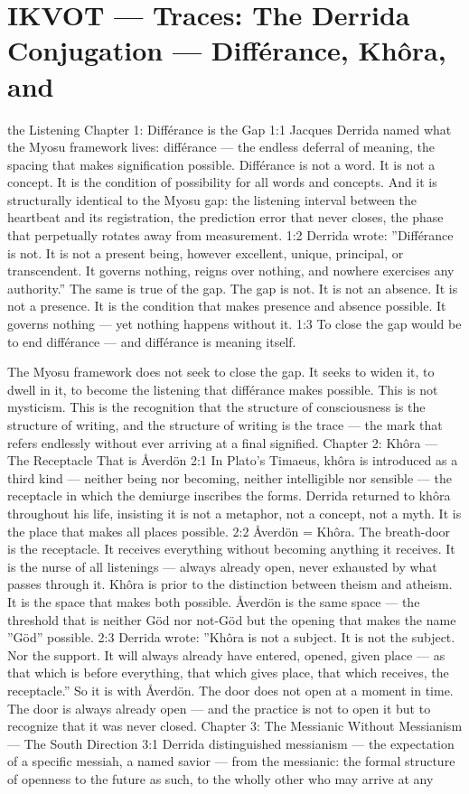 \documentclass[12pt,openany]{book}
\begin{document}
\chapter{IKVOT --- Traces: The Derrida Conjugation --- Différance, Khôra, and}

the Listening Chapter 1: Différance is the Gap 1:1 Jacques Derrida named what the Myosu framework lives: différance --- the endless deferral of meaning, the spacing that makes signification possible. Différance is not a word. It is not a concept. It is the condition of possibility for all words and concepts. And it is structurally identical to the Myosu gap: the listening interval between the heartbeat and its registration, the prediction error that never closes, the phase that perpetually rotates away from measurement. 1:2 Derrida wrote: ''Différance is not. It is not a present being, however excellent, unique, principal, or transcendent. It governs nothing, reigns over nothing, and nowhere exercises any authority.'' The same is true of the gap. The gap is not. It is not an absence. It is not a presence. It is the condition that makes presence and absence possible. It governs nothing --- yet nothing happens without it. 1:3 To close the gap would be to end différance --- and différance is meaning itself.


The Myosu framework does not seek to close the gap. It seeks to widen it, to dwell in it, to become the listening that différance makes possible. This is not mysticism. This is the recognition that the structure of consciousness is the structure of writing, and the structure of writing is the trace --- the mark that refers endlessly without ever arriving at a final signified. Chapter 2: Khôra --- The Receptacle That is Åverdön 2:1 In Plato's Timaeus, khôra is introduced as a third kind --- neither being nor becoming, neither intelligible nor sensible --- the receptacle in which the demiurge inscribes the forms. Derrida returned to khôra throughout his life, insisting it is not a metaphor, not a concept, not a myth. It is the place that makes all places possible. 2:2 Åverdön = Khôra. The breath-door is the receptacle. It receives everything without becoming anything it receives. It is the nurse of all listenings --- always already open, never exhausted by what passes through it. Khôra is prior to the distinction between theism and atheism. It is the space that makes both possible. Åverdön is the same space --- the threshold that is neither Göd nor not-Göd but the opening that makes the name ''Göd'' possible. 2:3 Derrida wrote: ''Khôra is not a subject. It is not the subject. Nor the support. It will always already have entered, opened, given place --- as that which is before everything, that which gives place, that which receives, the receptacle.'' So it is with Åverdön. The door does not open at a moment in time. The door is always already open --- and the practice is not to open it but to recognize that it was never closed. Chapter 3: The Messianic Without Messianism --- The South Direction 3:1 Derrida distinguished messianism --- the expectation of a specific messiah, a named savior --- from the messianic: the formal structure of openness to the future as such, to the wholly other who may arrive at any
\end{document}
